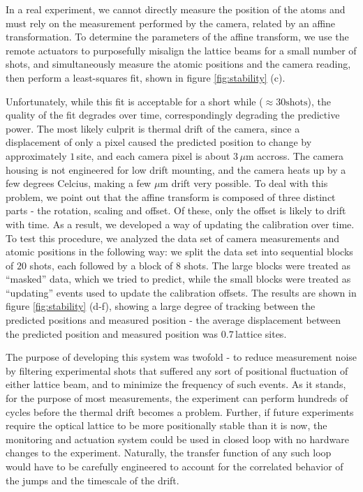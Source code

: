 \documentclass[twocolumn,aps,pra,showpacs,preprintnumbers,bibnotes]{revtex4-1}
\begin{document}
In a real experiment, we cannot directly measure the position of the atoms and must rely on the measurement performed by the camera, related by an affine transformation.
To determine the parameters of the affine transform, we use the remote actuators to purposefully misalign the lattice beams for a small number of shots, and simultaneously measure the atomic positions and the camera reading, then perform a least-squares fit, shown in figure \ref{fig:stability} (c).

Unfortunately, while this fit is acceptable for a short while ($\approx30\mathrm{ shots}$), the quality of the fit degrades over time, correspondingly degrading the predictive power. 
The most likely culprit is thermal drift of the camera, since a displacement of only a pixel caused the predicted position to change by approximately $1\,$site, and each camera pixel is about $3\,\mu$m accross. 
The camera housing is not engineered for low drift mounting, and the camera heats up by a few degrees Celcius, making a few $\mu$m drift very possible.
To deal with this problem, we point out that the affine transform is composed of three distinct parts - the rotation, scaling and offset. 
Of these, only the offset is likely to drift with time.
As a result, we developed a way of updating the calibration over time. To test this procedure, we analyzed the data set of camera measurements and atomic positions in the following way: we split the data set into sequential blocks of $20$ shots, each followed by a block of $8$ shots. 
The large blocks were treated as ``masked'' data, which we tried to predict, while the small blocks were treated as ``updating'' events used to update the calibration offsets.
The results are shown in figure \ref{fig:stability} (d-f), showing a large degree of tracking between the predicted positions and measured position - the average displacement between the predicted position and measured position was $0.7\,$lattice sites. 

The purpose of developing this system was twofold - to reduce measurement noise by filtering experimental shots that suffered any sort of positional fluctuation of either lattice beam, and to minimize the frequency of such events. As it stands, for the purpose of most measurements, the experiment can perform hundreds of cycles before the thermal drift becomes a problem.
Further, if future experiments require the optical lattice to be more positionally stable than it is now, the monitoring and actuation system could be used in closed loop with no hardware changes to the experiment.
Naturally, the transfer function of any such loop would have to be carefully engineered to account for the correlated behavior of the jumps and the timescale of the drift.
\end{document}
